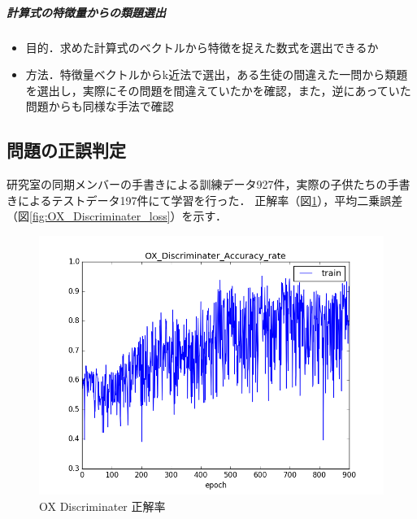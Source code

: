 \documentclass[a4j,11pt,report]{jsbook}
\begin{document}
\subparagraph{計算式の特徴量からの類題選出}
\begin{itemize}ß
  \item 目的．求めた計算式のベクトルから特徴を捉えた数式を選出できるか
  \item 方法．特徴量ベクトルからk近法で選出，ある生徒の間違えた一問から類題を選出し，実際にその問題を間違えていたかを確認，また，逆にあっていた問題からも同様な手法で確認

\end{itemize}
\fi
\subsection{問題の正誤判定}
研究室の同期メンバーの手書きによる訓練データ927件，実際の子供たちの手書きによるテストデータ197件にて学習を行った．
正解率（図\ref{fig:OX_Discriminater_ACC}），平均二乗誤差（図\ref{fig:OX_Discriminater_loss}）を示す．

\begin{center}
  \begin{figure}[H]
    \centering
    \includegraphics[width=0.8\linewidth]{image/OX_Discriminater_Accuracy_rateplot.png}
    \caption{OX Discriminater 正解率}
    \label{fig:OX_Discriminater_ACC}
  \end{figure}
\end{center}
\end{document}
